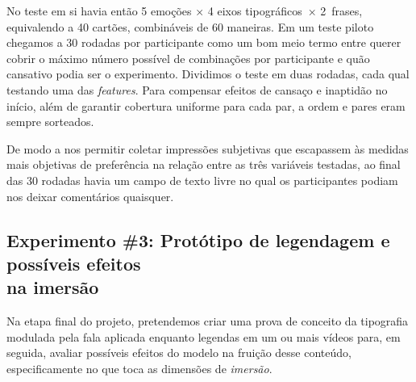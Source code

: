 \documentclass[a4paper]{tufte-handout}
\begin{document}
No teste em si havia então 5 emoções × 4 eixos tipográficos~× 2~frases, equivalendo a 40 cartões, combináveis de 60 maneiras. Em um teste piloto chegamos a 30 rodadas por participante como um bom meio termo entre querer cobrir o máximo número possível de combinações por participante e quão cansativo podia ser o experimento. Dividimos o teste em duas rodadas, cada qual testando uma das \textit{features}. Para compensar efeitos de cansaço e inaptidão no início, além de garantir cobertura uniforme para cada par, a ordem e pares eram sempre sorteados.

De modo a nos permitir coletar impressões subjetivas que escapassem às medidas mais objetivas de preferência na relação entre as três variáveis testadas, ao final das 30 rodadas havia um campo de texto livre no qual os participantes podiam nos deixar comentários quaisquer.

\subsection{Experimento \#3: Protótipo de legendagem e possíveis efeitos \protect\\ na imersão}\label{sec:met_exp_3}

Na etapa final do projeto, pretendemos criar uma prova de conceito da tipografia modulada pela fala aplicada enquanto legendas em um ou mais vídeos para, em seguida, avaliar possíveis efeitos do modelo na fruição desse conteúdo, especificamente no que toca as dimensões de \textit{imersão}.

\end{document}
